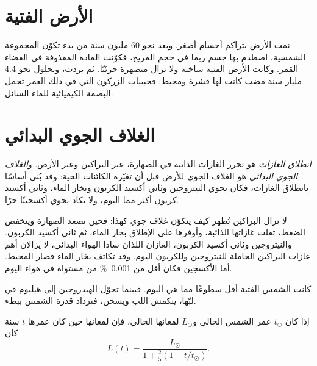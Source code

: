 \section{الأرض الفتية}

نمت الأرض بتراكم أجسام أصغر. وبعد نحو 60 مليون سنة
من بدء تكوّن المجموعة الشمسية، اصطدم بها جسم ربما في حجم المريخ،
فكوّنت المادة المقذوفة في الفضاء القمر. وكانت الأرض الفتية
ساخنة ولا تزال منصهرة جزئيًا. ثم بردت، وبحلول نحو 4.4 مليار سنة مضت
كانت لها قشرة ومحيط: فحبيبات الزركون التي في ذلك العمر تحمل البصمة الكيميائية
للماء السائل.

\section{الغلاف الجوي البدائي}

\begin{definition}\label{def:g12:early-earth:primitive-atmosphere}
\emph{انطلاق الغازات} هو تحرر الغازات الذائبة في
الصهارة، عبر البراكين وعبر الأرض. و\emph{الغلاف الجوي
البدائي} هو الغلاف الجوي للأرض قبل أن
تغيّره الكائنات الحية: وقد بُني أساسًا بانطلاق الغازات، فكان يحوي النيتروجين
وثاني أكسيد الكربون وبخار الماء، وثاني أكسيد كربون أكثر مما اليوم، ولا يكاد
يحوي أكسجينًا حرًا.
\end{definition}

لا تزال البراكين تُظهر كيف يتكوّن غلاف جوي كهذا: فحين تصعد الصهارة وينخفض
الضغط، تفلت غازاتها الذائبة، وأوفرها على الإطلاق
بخار الماء، ثم ثاني أكسيد الكربون. والنيتروجين وثاني أكسيد الكربون، الغازان
اللذان سادا الهواء البدائي، لا يزالان أهم غازات البراكين الحاملة للنيتروجين
وللكربون اليوم. وقد تكاثف بخار الماء فصار
المحيط. أما الأكسجين فكان أقل من \qty{0.001}{\percent} من مستواه في هواء
اليوم.

كانت الشمس الفتية أقل سطوعًا مما هي اليوم. فبينما تحوّل الهيدروجين إلى
هيليوم في لبّها، ينكمش اللب ويسخن، فتزداد قدرة الشمس
ببطء.

\begin{proposition}\label{prop:g12:early-earth:luminosity}
إذا كان $t_\odot$ عمر الشمس الحالي و$L_\odot$ لمعانها
الحالي، فإن لمعانها حين كان عمرها $t$ سنة كان
\[
  L(t) = \frac{L_\odot}{1 + \frac{2}{5}\left(1 - t/t_\odot\right)} .
\]
\end{proposition}

